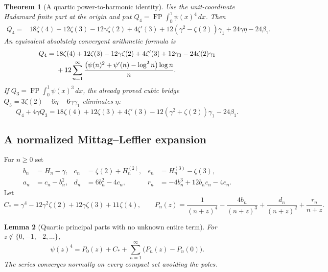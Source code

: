 \documentclass[11pt]{article}
\numberwithin{equation}{section}
\theoremstyle{plain}
\newtheorem{theorem}{Theorem}[section]
\newtheorem{lemma}[theorem]{Lemma}
\theoremstyle{definition}
\theoremstyle{remark}
\begin{document}
\begin{theorem}[A quartic power-to-harmonic identity]
\label{bhr:quartic-harmonic:main}
Use the unit-coordinate Hadamard finite part at the origin and put
$Q_4=\operatorname{FP}\int_0^1\psi(x)^4\,dx$. Then
\begin{align}
 Q_4={}&18\zeta(4)+12\zeta(3)-12\gamma\zeta(2)+4\zeta'(3)
       +12(\gamma^2-\zeta(2))\gamma_1
       +24\gamma\eta-24\beta_1.
       \label{bhr:quartic-harmonic:main-eq}
\end{align}
An equivalent absolutely convergent arithmetic formula is
\begin{align}
 Q_4={}&18\zeta(4)+12\zeta(3)-12\gamma\zeta(2)+4\zeta'(3)
          +12\gamma_3-24\zeta(2)\gamma_1\notag\\
 &+12\sum_{n=1}^{\infty}
       \frac{\bigl(\psi(n)^2+\psi'(n)-\log^2 n\bigr)\log n}{n}.
       \label{bhr:quartic-harmonic:arithmetic}
\end{align}
If $Q_3=\operatorname{FP}\int_0^1\psi(x)^3\,dx$, the already proved
cubic bridge \cite{bhr:Cubic} $Q_3=3\zeta(2)-6\eta-6\gamma\gamma_1$ eliminates $\eta$:
\begin{equation}
 Q_4+4\gamma Q_3
   =18\zeta(4)+12\zeta(3)+4\zeta'(3)
       -12(\gamma^2+\zeta(2))\gamma_1-24\beta_1.
       \label{bhr:quartic-harmonic:combined}
\end{equation}
\end{theorem}

\subsection{A normalized Mittag--Leffler expansion}

For $n\ge0$ set
\begin{align*}
 b_n&=H_n-\gamma,& c_n&=\zeta(2)+H_n^{(2)},&
 e_n&=H_n^{(3)}-\zeta(3),\\
 a_n&=c_n-b_n^2,& d_n&=6b_n^2-4c_n,&
 r_n&=-4b_n^3+12b_nc_n-4e_n.
\end{align*}
Let
\[
 C_* =\gamma^4-12\gamma^2\zeta(2)+12\gamma\zeta(3)+11\zeta(4),
 \qquad
 P_n(z)=\frac1{(n+z)^4}-\frac{4b_n}{(n+z)^3}
          +\frac{d_n}{(n+z)^2}+\frac{r_n}{n+z}.
\]

\begin{lemma}[Quartic principal parts with no unknown entire term]
\label{bhr:quartic-harmonic:ML}
For $z\notin\{0,-1,-2,\ldots\}$,
\begin{equation}
 \psi(z)^4=P_0(z)+C_*+
     \sum_{n=1}^{\infty}\bigl(P_n(z)-P_n(0)\bigr).
     \label{bhr:quartic-harmonic:ML-eq}
\end{equation}
The series converges normally on every compact set avoiding the poles.
\end{lemma}
\end{document}
